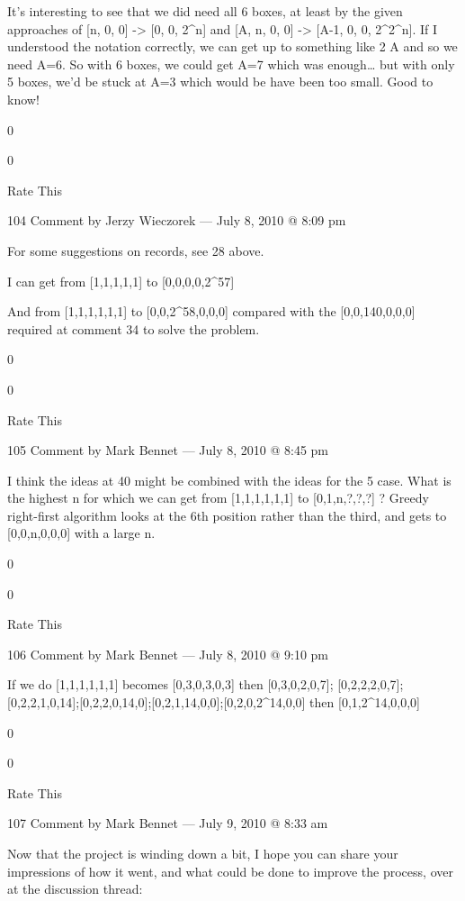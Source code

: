 {    It’s interesting to see that we did need all 6 boxes, at least by the given approaches of [n, 0, 0] -> [0, 0, 2^n] and [A, n, 0, 0] -> [A-1, 0, 0, 2^2^n].
    If I understood the notation correctly, we can get up to something like 2 \uparrow \uparrow A and so we need A=6.
    So with 6 boxes, we could get A=7 which was enough… but with only 5 boxes, we’d be stuck at A=3 which would be have been too small. Good to know!
     
    0
     
    0
     
    Rate This

    104 Comment by Jerzy Wieczorek — July 8, 2010 @ 8:09 pm

    For some suggestions on records, see 28 above.

    I can get from [1,1,1,1,1] to [0,0,0,0,2^57]

    And from [1,1,1,1,1,1] to [0,0,2^58,0,0,0] compared with the [0,0,140,0,0,0] required at comment 34 to solve the problem.
     
    0
     
    0
     
    Rate This

    105 Comment by Mark Bennet — July 8, 2010 @ 8:45 pm

        I think the ideas at 40 might be combined with the ideas for the 5 case.
        What is the highest n for which we can get from [1,1,1,1,1,1] to [0,1,n,?,?,?] ?
        Greedy right-first algorithm looks at the 6th position rather than the third, and gets to [0,0,n,0,0,0] with a large n.
         
        0
         
        0
         
        Rate This

        106 Comment by Mark Bennet — July 8, 2010 @ 9:10 pm

            If we do [1,1,1,1,1,1] becomes [0,3,0,3,0,3]
            then [0,3,0,2,0,7]; [0,2,2,2,0,7];[0,2,2,1,0,14];[0,2,2,0,14,0];[0,2,1,14,0,0];[0,2,0,2^14,0,0]
            then [0,1,2^14,0,0,0]
             
            0
             
            0
             
            Rate This

            107 Comment by Mark Bennet — July 9, 2010 @ 8:33 am

    Now that the project is winding down a bit, I hope you can share your impressions of how it went, and what could be done to improve the process, over at the discussion thread:

}
